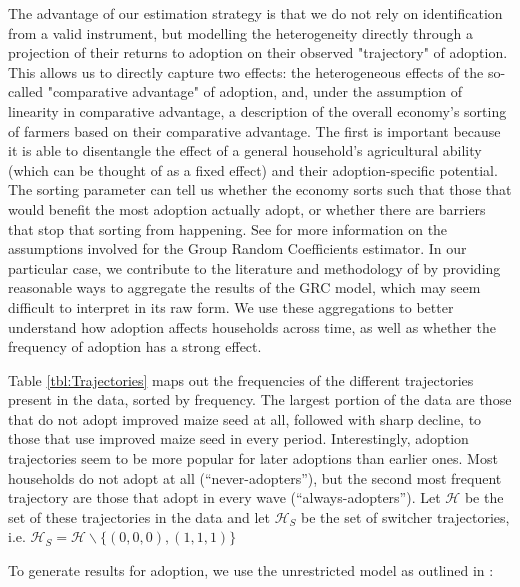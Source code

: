 \documentclass{article}
\begin{document}
The advantage of our estimation strategy is that we do not rely on identification from a valid instrument, but modelling the heterogeneity directly through a projection of their returns to adoption on their observed "trajectory" of adoption. This allows us to directly capture two effects: the heterogeneous effects of the so-called "comparative advantage" of adoption, and, under the assumption of linearity in comparative advantage, a description of the overall economy's sorting of farmers based on their comparative advantage. The first is important because it is able to disentangle the effect of a general household's agricultural ability (which can be thought of as a fixed effect) and their adoption-specific potential. The sorting parameter can tell us whether the economy sorts such that those that would benefit the most adoption actually adopt, or whether there are barriers that stop that sorting from happening. See \cite{Tjernstrom_Emilia_Dalia_Ghanem_Oscar_Barriga_Cabanillas_Travis_J_Lybbert_Jeffrey_D_Michler_and_Aleksandr_Michuda2020-bc} for more information on the assumptions involved for the Group Random Coefficients estimator. In our particular case, we contribute to the literature and methodology of \cite{Tjernstrom_Emilia_Dalia_Ghanem_Oscar_Barriga_Cabanillas_Travis_J_Lybbert_Jeffrey_D_Michler_and_Aleksandr_Michuda2020-bc} by providing reasonable ways to aggregate the results of the GRC model, which may seem difficult to interpret in its raw form. We use these aggregations to better understand how adoption affects households across time, as well as whether the frequency of adoption has a strong effect.



Table \ref{tbl:Trajectories} maps out the frequencies of the different trajectories present in the data, sorted by frequency. The largest portion of the data are those that do not adopt improved maize seed at all, followed with sharp decline, to those that use improved maize seed in every period. Interestingly, adoption trajectories seem to be more popular for later adoptions than earlier ones. Most households do not adopt at all (``never-adopters''), but the second most frequent trajectory are those that adopt in every wave (``always-adopters''). Let $\mathcal{H}$ be the set of these trajectories in the data and let $\mathcal{H}_S$ be the set of switcher trajectories, i.e. $\mathcal{H}_S = \mathcal{H}\backslash\{(0,0,0), (1,1,1)\}$

To generate results for adoption, we use the unrestricted model as outlined in \cite{Tjernstrom_Emilia_Dalia_Ghanem_Oscar_Barriga_Cabanillas_Travis_J_Lybbert_Jeffrey_D_Michler_and_Aleksandr_Michuda2020-bc}:
\end{document}
